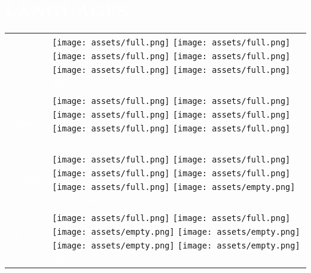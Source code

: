 \documentclass[../main.tex]{subfiles}
\begin{document}
    \vspace*{0.25cm}\section*{\hspace*{0.4cm}\textcolor{white}{LANGUAGES}}
    \vspace*{-0.15cm}
    \begin{tabular}{r l}
    \hspace*{0.5cm}
    \textcolor{white}{\vspace*{0.1cm}Catalan} &            
            \texttt{[image: assets/full.png]}
            \texttt{[image: assets/full.png]}
            \texttt{[image: assets/full.png]}
            \texttt{[image: assets/full.png]}
            \texttt{[image: assets/full.png]}
            \texttt{[image: assets/full.png]}
            \textcolor{white}{\hspace*{0.05cm} Native}\\ 
    \textcolor{white}{\vspace*{0.1cm}Spanish} &
            \texttt{[image: assets/full.png]}
            \texttt{[image: assets/full.png]}
            \texttt{[image: assets/full.png]}
            \texttt{[image: assets/full.png]}
            \texttt{[image: assets/full.png]}
            \texttt{[image: assets/full.png]}
            \textcolor{white}{\hspace*{0.05cm} Native}\\
    \textcolor{white}{\vspace*{0.1cm}English} &
            \texttt{[image: assets/full.png]}
            \texttt{[image: assets/full.png]}
            \texttt{[image: assets/full.png]}
            \texttt{[image: assets/full.png]}
            \texttt{[image: assets/full.png]}
            \texttt{[image: assets/empty.png]}
            \textcolor{white}{\hspace*{0.05cm} C1, Advanced}\\
    \textcolor{white}{French} &
            \texttt{[image: assets/full.png]}
            \texttt{[image: assets/full.png]}
            \texttt{[image: assets/empty.png]}
            \texttt{[image: assets/empty.png]}
            \texttt{[image: assets/empty.png]}
            \texttt{[image: assets/empty.png]}
            \textcolor{white}{\hspace*{0.05cm} A2, Basic}\\
    \end{tabular}
\end{document}
